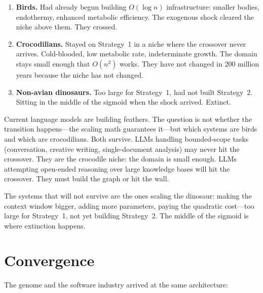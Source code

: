 \documentclass[11pt]{article}
\theoremstyle{definition}
\begin{document}
\begin{enumerate}
\item \textbf{Birds.} Had already begun building $O(\log n)$
   infrastructure: smaller bodies, endothermy, enhanced metabolic
   efficiency. The exogenous shock cleared the niche above them.
   They crossed.
\item \textbf{Crocodilians.} Stayed on Strategy~1 in a niche where
   the crossover never arrives. Cold-blooded, low metabolic rate,
   indeterminate growth. The domain stays small enough that $O(n^2)$
   works. They have not changed in 200 million years because the
   niche has not changed.
\item \textbf{Non-avian dinosaurs.} Too large for Strategy~1, had not
   built Strategy~2. Sitting in the middle of the sigmoid when the
   shock arrived. Extinct.
\end{enumerate}

Current language models are building feathers. The question is not
whether the transition happens---the scaling math guarantees it---but
which systems are birds and which are crocodilians. Both survive.
LLMs handling bounded-scope tasks (conversation, creative writing,
single-document analysis) may never hit the crossover. They are the
crocodile niche: the domain is small enough. LLMs attempting
open-ended reasoning over large knowledge bases will hit the
crossover. They must build the graph or hit the wall.

The systems that will not survive are the ones scaling the
dinosaur: making the context window bigger, adding more parameters,
paying the quadratic cost---too large for Strategy~1, not yet
building Strategy~2. The middle of the sigmoid is where extinction
happens.

\section{Convergence}
\label{sec:convergence}

The genome and the software industry arrived at the same architecture:
\end{document}
